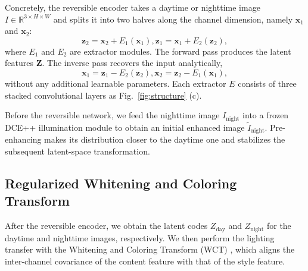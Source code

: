 \documentclass{article}
\begin{document}
Concretely, the reversible encoder takes a daytime or nighttime image $I \in \mathbb{R}^{3 \times H \times W}$ and splits it into two halves along the channel dimension, namely $\bm{x}_1$ and $\bm{x}_2$:
\begin{equation}
    \bm{z}_2 = \bm{x}_2 + {E}_1(\bm{x}_1), 
    \bm{z}_1 = \bm{x}_1 + {E}_2(\bm{z}_2),
\end{equation}
where ${E}_1$ and ${E}_2$ are extractor modules. The forward pass produces the latent features $\bm{Z}$. The inverse pass recovers the input analytically,
\begin{equation}
    \bm{x}_1 = \bm{z}_1 - {E}_2(\bm{z}_2), 
    \bm{x}_2 = \bm{z}_2 - {E}_1(\bm{x}_1),
\end{equation}
without any additional learnable parameters. Each extractor ${E}$ consists of three stacked convolutional layers as Fig.~\ref{fig:structure} (c). 


Before the reversible network, we feed the nighttime image $I_{\text{night}}$ into a frozen DCE++ \cite{zero-dceplus} illumination module to obtain an initial enhanced image $\widetilde{I}_{\text{night}}$. Pre-enhancing makes its distribution closer to the daytime one and stabilizes the subsequent latent-space transformation.


\subsection{Regularized Whitening and Coloring Transform}

After the reversible encoder, we obtain the latent codes $Z_{\text{day}}$ and $Z_{\text{night}}$ for the daytime and nighttime images, respectively. We then perform the lighting transfer with the Whitening and Coloring Transform (WCT) \cite{capvst}, which aligns the inter-channel covariance of the content feature with that of the style feature. 
\end{document}
